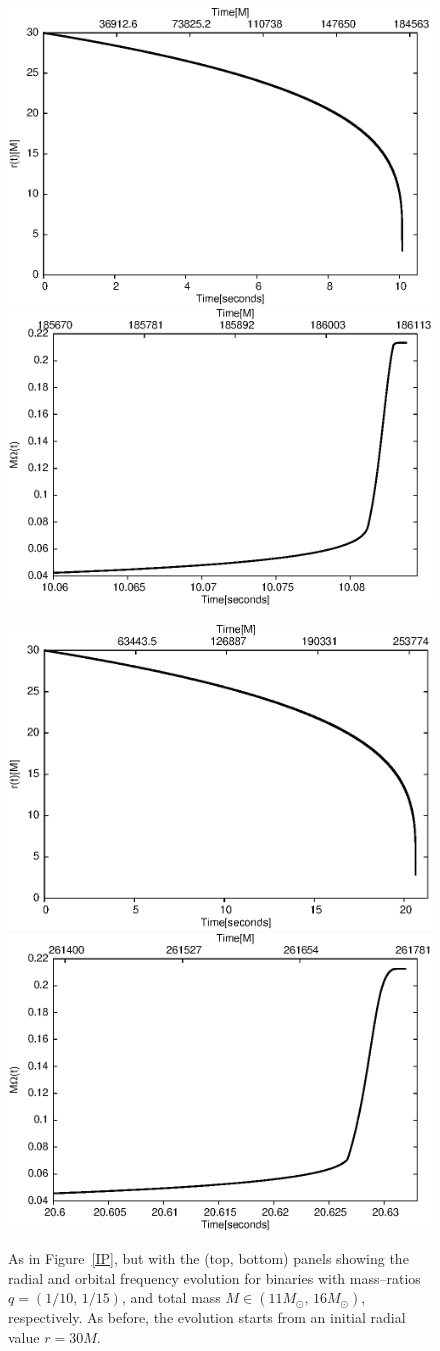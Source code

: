 \begin{figure}[ht]
\centerline{
\includegraphics[height=0.4\textwidth,  clip]{figures/imrimri/rvstm1m10.eps}
\includegraphics[height=0.4\textwidth,  clip]{figures/imrimri/xvsMOmegam1m10.eps}
}
\centerline{
\includegraphics[height=0.4\textwidth,  clip]{figures/imrimri/rvstm1m15.eps}
\includegraphics[height=0.4\textwidth,  clip]{figures/imrimri/xvsMOmegam1m15.eps}
}
\caption{As in Figure~\ref{IP}, but with the (top, bottom) panels showing the radial and orbital frequency evolution for binaries with mass--ratios \(q=(1/10,\,1/15)\), and total mass \(M\in( 11M_{\odot},\, 16M_{\odot})  \), respectively.  As before, the evolution starts from an initial radial value \(r=30M\).}
\label{IPI}
\end{figure}


